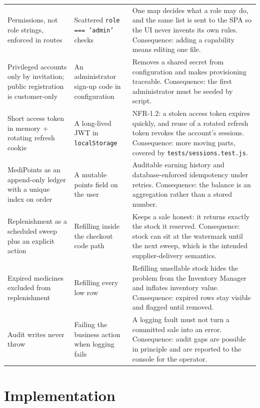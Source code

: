 \documentclass[11pt,a4paper]{article}
\begin{document}
{\begin{longtable}{@{}L{4.50cm}L{4.30cm}L{6.64cm}@{}}
Permissions, not role strings, enforced in routes & Scattered \texttt{role === 'admin'} checks & One map decides what a role may do, and the same list is sent to the SPA so the UI never invents its own rules. Consequence: adding a capability means editing one file.\\
Privileged accounts only by invitation; public registration is customer-only & An administrator sign-up code in configuration & Removes a shared secret from configuration and makes provisioning traceable. Consequence: the first administrator must be seeded by script.\\
Short access token in memory + rotating refresh cookie & A long-lived JWT in \texttt{localStorage} & NFR-1.2: a stolen access token expires quickly, and reuse of a rotated refresh token revokes the account's sessions. Consequence: more moving parts, covered by \texttt{tests/sessions.test.js}.\\
MediPoints as an append-only ledger with a unique index on order & A mutable points field on the user & Auditable earning history and database-enforced idempotency under retries. Consequence: the balance is an aggregation rather than a stored number.\\
Replenishment as a scheduled sweep plus an explicit action & Refilling inside the checkout code path & Keeps a sale honest: it returns exactly the stock it reserved. Consequence: stock can sit at the watermark until the next sweep, which is the intended supplier-delivery semantics.\\
Expired medicines excluded from replenishment & Refilling every low row & Refilling unsellable stock hides the problem from the Inventory Manager and inflates inventory value. Consequence: expired rows stay visible and flagged until removed.\\
Audit writes never throw & Failing the business action when logging fails & A logging fault must not turn a committed sale into an error. Consequence: audit gaps are possible in principle and are reported to the console for the operator.\\
\end{longtable}
}

\section{Implementation}
\end{document}
